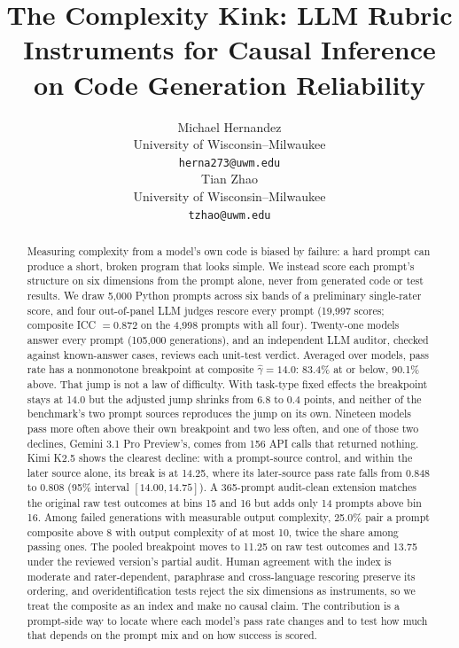 \documentclass{article}
\title{The Complexity Kink: LLM Rubric Instruments for Causal Inference on Code Generation Reliability}
\author{%
  Michael Hernandez \\
  University of Wisconsin--Milwaukee \\
  \texttt{herna273@uwm.edu} \\
  \And
  Tian Zhao \\
  University of Wisconsin--Milwaukee \\
  \texttt{tzhao@uwm.edu}
}
\begin{document}
\maketitle

\begin{abstract}
Measuring complexity from a model's own code is biased by failure: a hard prompt can produce a short, broken program that looks simple. We instead score each prompt's structure on six dimensions from the prompt alone, never from generated code or test results. We draw 5{,}000 Python prompts across six bands of a preliminary single-rater score, and four out-of-panel LLM judges rescore every prompt (19{,}997 scores; composite ICC $=0.872$ on the 4{,}998 prompts with all four). Twenty-one models answer every prompt (105{,}000 generations), and an independent LLM auditor, checked against known-answer cases, reviews each unit-test verdict. Averaged over models, pass rate has a nonmonotone breakpoint at composite $\hat{\gamma}=14.0$: 83.4\% at or below, 90.1\% above. That jump is not a law of difficulty. With task-type fixed effects the breakpoint stays at 14.0 but the adjusted jump shrinks from 6.8 to 0.4 points, and neither of the benchmark's two prompt sources reproduces the jump on its own. Nineteen models pass more often above their own breakpoint and two less often, and one of those two declines, Gemini 3.1 Pro Preview's, comes from 156 API calls that returned nothing. Kimi K2.5 shows the clearest decline: with a prompt-source control, and within the later source alone, its break is at 14.25, where its later-source pass rate falls from 0.848 to 0.808 (95\% interval $[14.00,14.75]$). A 365-prompt audit-clean extension matches the original raw test outcomes at bins 15 and 16 but adds only 14 prompts above bin 16. Among failed generations with measurable output complexity, 25.0\% pair a prompt composite above 8 with output complexity of at most 10, twice the share among passing ones. The pooled breakpoint moves to 11.25 on raw test outcomes and 13.75 under the reviewed version's partial audit. Human agreement with the index is moderate and rater-dependent, paraphrase and cross-language rescoring preserve its ordering, and overidentification tests reject the six dimensions as instruments, so we treat the composite as an index and make no causal claim. The contribution is a prompt-side way to locate where each model's pass rate changes and to test how much that depends on the prompt mix and on how success is scored.
\end{abstract}
\end{document}
